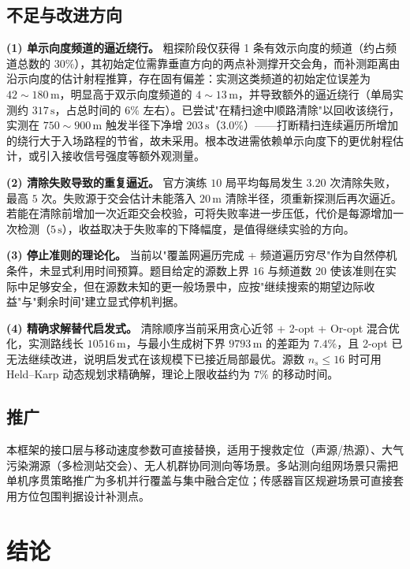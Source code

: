 \documentclass[12pt,a4paper]{ctexart}
\begin{document}
\subsection{不足与改进方向}

\textbf{(1) 单示向度频道的逼近绕行。} 粗探阶段仅获得 1 条有效示向度的频道（约占频道总数的 $30\%$），其初始定位需靠垂直方向的两点补测撑开交会角，而补测距离由沿示向度的估计射程推算，存在固有偏差：实测这类频道的初始定位误差为 $42\sim180\,\text{m}$，明显高于双示向度频道的 $4\sim13\,\text{m}$，并导致额外的逼近绕行（单局实测约 $317\,\text{s}$，占总时间的 $6\%$ 左右）。已尝试"在精扫途中顺路清除"以回收该绕行，实测在 $750\sim900\,\text{m}$ 触发半径下净增 $203\,\text{s}$（$3.0\%$）——打断精扫连续遍历所增加的绕行大于入场路程的节省，故未采用。根本改进需依赖单示向度下的更优射程估计，或引入接收信号强度等额外观测量。

\textbf{(2) 清除失败导致的重复逼近。} 官方演练 $10$ 局平均每局发生 $3.20$ 次清除失败，最高 $5$ 次。失败源于交会估计未能落入 $20\,\text{m}$ 清除半径，须重新探测后再次逼近。若能在清除前增加一次近距交会校验，可将失败率进一步压低，代价是每源增加一次检测（$5\,\text{s}$），收益取决于失败率的下降幅度，是值得继续实验的方向。

\textbf{(3) 停止准则的理论化。} 当前以"覆盖网遍历完成 + 频道遍历穷尽"作为自然停机条件，未显式利用时间预算。题目给定的源数上界 $16$ 与频道数 $20$ 使该准则在实际中足够安全，但在源数未知的更一般场景中，应按"继续搜索的期望边际收益"与"剩余时间"建立显式停机判据。

\textbf{(4) 精确求解替代启发式。} 清除顺序当前采用贪心近邻 + 2-opt + Or-opt 混合优化，实测路线长 $10516\,\text{m}$，与最小生成树下界 $9793\,\text{m}$ 的差距为 $7.4\%$，且 2-opt 已无法继续改进，说明启发式在该规模下已接近局部最优。源数 $n_s\le16$ 时可用 Held--Karp 动态规划求精确解，理论上限收益约为 $7\%$ 的移动时间。

\subsection{推广}

本框架的接口层与移动速度参数可直接替换，适用于搜救定位（声源/热源）、大气污染溯源（多检测站交会）、无人机群协同测向等场景。多站测向组网场景只需把单机序贯策略推广为多机并行覆盖与集中融合定位；传感器盲区规避场景可直接套用方位包围判据设计补测点。

\section{结论}
\end{document}
